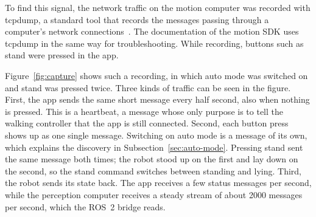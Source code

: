 To find this signal, the network traffic on the motion computer was recorded with tcpdump, a standard tool
that records the messages passing through a computer's network connections~\cite{tcpdump}. The
documentation of the motion SDK uses tcpdump in the same way for troubleshooting. While recording, buttons
such as stand were pressed in the app.

Figure~\ref{fig:capture} shows such a recording, in which auto mode was switched on and stand was pressed
twice. Three kinds of traffic can be seen in the figure.
First, the app sends the same short message every half second, also when nothing is pressed. This is a
heartbeat, a message whose only purpose is to tell the walking controller that the app is still
connected. Second, each button press shows up as one single message. Switching on auto mode is a message of its
own, which explains the discovery in Subsection~\ref{sec:auto-mode}. Pressing stand sent the same message
both times; the robot stood up on the first and lay down on the second, so the stand command switches
between standing and lying. Third, the robot sends its state back. The app receives a few status messages
per second, while the perception computer receives a steady stream of about 2000 messages per second, which
the ROS~2 bridge reads.

